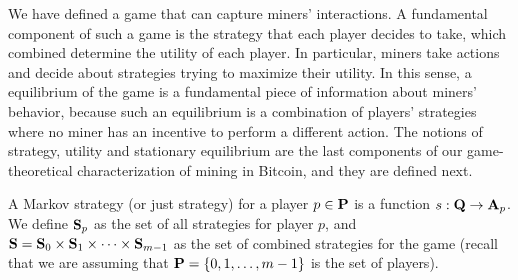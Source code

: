 
We have defined a game that can capture miners' interactions. A fundamental component of such a game is the strategy that each player decides to take, which combined determine the utility of each player. In particular, miners take actions and decide about strategies trying to maximize their utility. In this sense, a 
equilibrium of the game is a fundamental piece of information about miners' behavior, because such an equilibrium is a combination of players' strategies where no miner has an incentive to perform a different action. The notions of strategy, utility and stationary equilibrium are the last components of our game-theoretical characterization of mining in Bitcoin, and they are defined next. 

A Markov strategy (or just strategy) for a player $p \in \mathbf{P}$ is a function $s : \mathbf{Q} \rightarrow \mathbf{A}_p$.
We define $\mathbf{S}_p$ as the set of all strategies for player $p$, and $\mathbf{S} = \mathbf{S}_0 \times \mathbf{S}_{1} \times \cdots \times \mathbf{S}_{m-1}$ as the set of combined strategies for the game (recall that we are assuming that $\mathbf{P} = \{0, 1, \ldots, m-1\}$ is the set of players).

